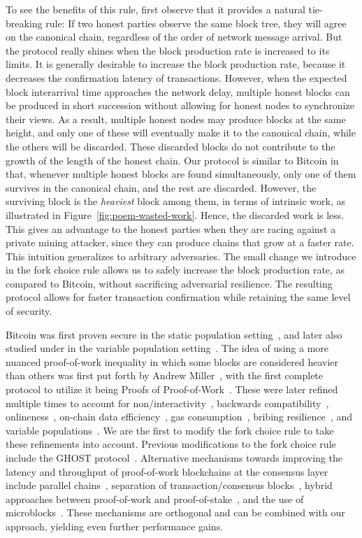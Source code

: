 To see the benefits of this rule, first observe that it provides a natural tie-breaking rule:
If two honest parties observe the same block tree, they will agree on
the canonical chain, regardless of the order of network message arrival. But the protocol
really shines when the block production rate is increased to its limits. It is generally desirable
to increase the block production rate, because it decreases the confirmation latency of transactions.
However, when the expected block interarrival time approaches the network delay, multiple honest blocks
can be produced in short succession without allowing for honest nodes to synchronize their views.
As a result, multiple honest nodes may produce blocks at the same height, and only one of these will
eventually make it to the canonical chain, while the others will be discarded. These discarded blocks
do not contribute to the growth of the length of the honest chain. Our protocol is similar to Bitcoin in that,
whenever multiple honest blocks are found simultaneously, only one of them survives in the canonical chain,
and the rest are discarded. However, the surviving block is the \emph{heaviest} block among them, in terms of intrinsic
work, as illustrated in Figure~\ref{fig:poem-wasted-work}. Hence, the discarded
work is less. This gives an advantage to the honest
parties when they are racing against a private mining attacker, since they can produce chains that grow
at a faster rate. This intuition generalizes to arbitrary adversaries.
The small change we introduce in the fork choice rule allows us to safely increase the block production
rate, as compared to Bitcoin, without sacrificing adversarial resilience. The resulting protocol
allows for faster transaction confirmation while retaining the same level of security.

\noindent
{}
Bitcoin was first proven secure in the static population setting~\cite{backbone},
and later also studied under in the variable population setting~\cite{varbackbone}.
The idea of using a more nuanced proof-of-work inequality in which some blocks
are considered heavier than others was first put forth by Andrew Miller~\cite{highway},
with the first complete protocol to utilize it being
Proofs of Proof-of-Work~\cite{popow}. These were later refined multiple times
to account for non\-/interactivity~\cite{nipopows}, backwards compatibility~\cite{velvet-nipopows},
onlineness~\cite{logspace}, on-chain data efficiency~\cite{compact-superblocks},
gas consumption~\cite{gasefficient-nipopows},
bribing resilience~\cite{soft-power},
and variable populations~\cite{dionyziz}.
We are the first to modify the fork choice rule to take these refinements into
account. Previous modifications to the fork choice rule include the GHOST
protocol~\cite{ghost}.
Alternative mechanisms towards improving the latency and throughput
of proof-of-work blockchains at the consensus
layer include parallel chains~\cite{parallel-chains},
separation of transaction/consensus blocks~\cite{prism},
hybrid approaches between proof-of-work and proof-of-stake~\cite{byzcoin},
and the use of microblocks~\cite{bitcoin-ng}. These mechanisms
are orthogonal and can be combined with our approach, yielding even
further performance gains.

